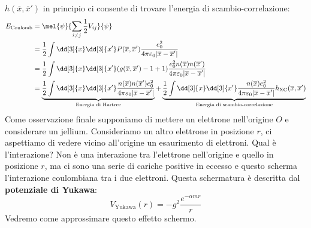 $h(\overline x, \overline{x}')$ in principio ci consente di trovare l'energia di scambio-correlazione:
\begin{equation*}
    \begin{aligned}
        E_{\text{Coulomb}} & =\mel{\psi}{\sum_{i\neq j}\frac 12 V_{ij}}{\psi} \\
        & = \frac 12 \int \dd[3]{x}\dd[3]{x'}P(\overline x, \overline{x}')\frac{e_0^2}{4\pi\varepsilon_0|\overline{x}-\overline{x}'|} \\
        & = \frac 12 \int \dd[3]{x}\dd[3]{x'}(g(\overline x, \overline{x}')-1+1)\frac{e_0^2n(\overline x)n(\overline{x}')}{4\pi\varepsilon_0|\overline{x}-\overline{x}'|} \\
        & = \underbrace{\frac 12 \int \dd[3]{x}\dd[3]{x'}\frac{n(\overline x)n(\overline{x}')e_0^2}{4\pi\varepsilon_0|\overline{x}-\overline{x}'|}}_{\text{Energia di Hartree}}+\underbrace{\frac 12 \int \dd[3]{x}\dd[3]{x'}\frac{n(\overline x)e_0^2}{4\pi\varepsilon_0|\overline{x}-\overline{x}'|}h_{\text{XC}}(\overline{x}, \overline{x}')}_{\text{Energia di scambio-correlazione}}
    \end{aligned}
\end{equation*}
Come osservazione finale supponiamo di mettere un elettrone nell'origine $O$ e considerare un jellium. Consideriamo un altro elettrone in posizione $r$, ci aspettiamo di vedere vicino all'origine un esaurimento di elettroni. Qual è l'interazione? Non è una interazione tra l'elettrone nell'origine e quello in posizione $r$, ma ci sono una serie di cariche positive in eccesso e questo scherma l'interazione coulombiana tra i due elettroni. Questa schermatura è descritta dal \textbf{potenziale di Yukawa}:
\begin{equation*}
    V_{\text{Yukawa}}(r)=-g^2\frac{e^{-\alpha mr}}{r}
\end{equation*}
Vedremo come approssimare questo effetto schermo.